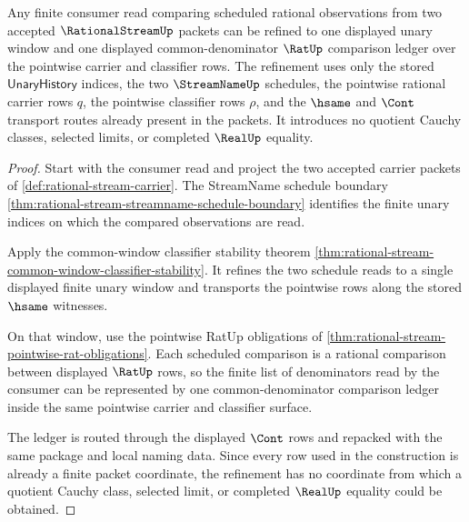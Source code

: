 \begin{theorem}
\label{thm:rationalstream-common-denominator-window-exhaustion}
Any finite consumer read comparing scheduled rational observations from two
accepted $\RationalStreamUp$ packets can be refined to one displayed unary
window and one displayed common-denominator $\RatUp$ comparison ledger over
the pointwise carrier and classifier rows. The refinement uses only the
stored $\mathsf{UnaryHistory}$ indices, the two $\StreamNameUp$ schedules,
the pointwise rational carrier rows $q$, the pointwise classifier rows
$\rho$, and the $\hsame$ and $\Cont$ transport routes already present in the
packets. It introduces no quotient Cauchy classes, selected limits, or
completed $\RealUp$ equality.
\end{theorem}
\begin{proof}
Start with the consumer read and project the two accepted carrier packets of
\autoref{def:rational-stream-carrier}. The StreamName schedule boundary
\autoref{thm:rational-stream-streamname-schedule-boundary} identifies the
finite unary indices on which the compared observations are read.

Apply the common-window classifier stability theorem
\autoref{thm:rational-stream-common-window-classifier-stability}. It refines
the two schedule reads to a single displayed finite unary window and transports
the pointwise rows along the stored $\hsame$ witnesses.

On that window, use the pointwise RatUp obligations of
\autoref{thm:rational-stream-pointwise-rat-obligations}. Each scheduled
comparison is a rational comparison between displayed $\RatUp$ rows, so the
finite list of denominators read by the consumer can be represented by one
common-denominator comparison ledger inside the same pointwise carrier and
classifier surface.

The ledger is routed through the displayed $\Cont$ rows and repacked with the
same package and local naming data. Since every row used in the construction
is already a finite packet coordinate, the refinement has no coordinate from
which a quotient Cauchy class, selected limit, or completed $\RealUp$ equality
could be obtained.
\end{proof}

